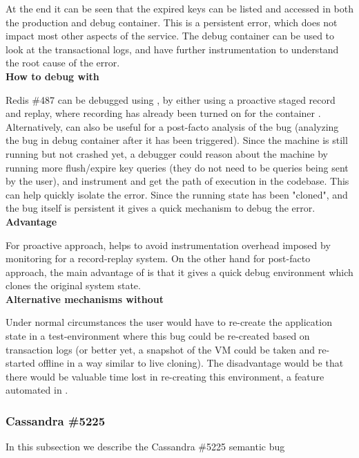 At the end it can be seen that the expired keys can be listed and accessed in both the production and debug container. This is a persistent error, which does not impact most other aspects of the service. The debug container can be used to look at the transactional logs, and have further instrumentation to understand the root cause of the error.\\

\noindent \textbf{How to debug with \parikshan}

Redis \#487 can be debugged using \parikshan, by either using a proactive staged record and replay, where recording has already been turned on for the container . Alternatively, \parikshan can also be useful for a post-facto analysis of the bug (analyzing the bug in debug container after it has been triggered). Since the machine is still running but not crashed yet, a debugger could reason about the machine by running more flush/expire key queries (they do not need to be queries being sent by the user), and instrument and get the path of execution in the codebase. This can help quickly isolate the error. Since the running state has been "cloned", and the bug itself is persistent it gives a quick mechanism to debug the error.\\

\noindent \textbf{Advantage}

For proactive approach, \parikshan helps to avoid instrumentation overhead imposed by monitoring for a record-replay system. 
On the other hand for post-facto approach, the main advantage of \parikshan is that it gives a quick debug environment which clones the original system state. \\

\noindent \textbf{Alternative mechanisms without \parikshan}

Under normal circumstances the user would have to re-create the application state in a test-environment where this bug could be re-created based on transaction logs (or better yet, a snapshot of the VM could be taken and re-started offline in a way similar to live cloning). The disadvantage would be that there would be valuable time lost in re-creating this environment, a feature automated in \parikshan.

\subsubsection{Cassandra \#5225}

In this subsection we describe the Cassandra \#5225 semantic bug \\

